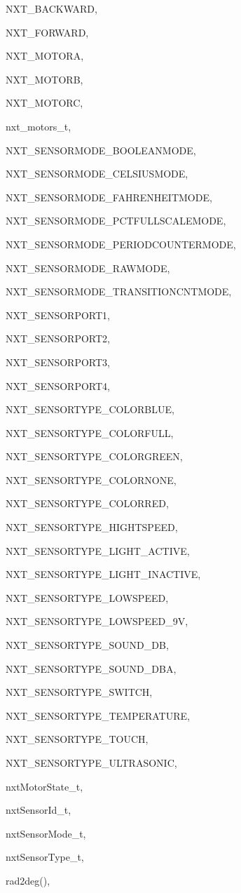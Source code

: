 \begin{theindex}
  \item NXT\_BACKWARD, 
  \item NXT\_FORWARD, 
  \item NXT\_MOTORA, 
  \item NXT\_MOTORB, 
  \item NXT\_MOTORC, 
  \item nxt\_motors\_t, 
  \item NXT\_SENSORMODE\_BOOLEANMODE, 
  \item NXT\_SENSORMODE\_CELSIUSMODE, 
  \item NXT\_SENSORMODE\_FAHRENHEITMODE, 
  \item NXT\_SENSORMODE\_PCTFULLSCALEMODE, 
  \item NXT\_SENSORMODE\_PERIODCOUNTERMODE, 
  \item NXT\_SENSORMODE\_RAWMODE, 
  \item NXT\_SENSORMODE\_TRANSITIONCNTMODE, 
  \item NXT\_SENSORPORT1, 
  \item NXT\_SENSORPORT2, 
  \item NXT\_SENSORPORT3, 
  \item NXT\_SENSORPORT4, 
  \item NXT\_SENSORTYPE\_COLORBLUE, 
  \item NXT\_SENSORTYPE\_COLORFULL, 
  \item NXT\_SENSORTYPE\_COLORGREEN, 
  \item NXT\_SENSORTYPE\_COLORNONE, 
  \item NXT\_SENSORTYPE\_COLORRED, 
  \item NXT\_SENSORTYPE\_HIGHTSPEED, 
  \item NXT\_SENSORTYPE\_LIGHT\_ACTIVE, 
  \item NXT\_SENSORTYPE\_LIGHT\_INACTIVE, 
  \item NXT\_SENSORTYPE\_LOWSPEED, 
  \item NXT\_SENSORTYPE\_LOWSPEED\_9V, 
  \item NXT\_SENSORTYPE\_SOUND\_DB, 
  \item NXT\_SENSORTYPE\_SOUND\_DBA, 
  \item NXT\_SENSORTYPE\_SWITCH, 
  \item NXT\_SENSORTYPE\_TEMPERATURE, 
  \item NXT\_SENSORTYPE\_TOUCH, 
  \item NXT\_SENSORTYPE\_ULTRASONIC, 
  \item nxtMotorState\_t, 
  \item nxtSensorId\_t, 
  \item nxtSensorMode\_t, 
  \item nxtSensorType\_t, 

  \indexspace

  \item rad2deg(), 

\end{theindex}
